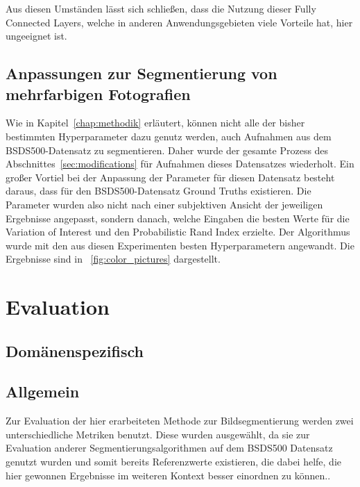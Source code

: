Aus diesen Umständen lässt sich schließen, dass die Nutzung dieser Fully Connected Layers, welche in anderen Anwendungsgebieten viele Vorteile hat, hier ungeeignet ist.

\subsection{Anpassungen zur Segmentierung von mehrfarbigen Fotografien}
\label{exp_colorpicture_optimization}

Wie in Kapitel~\ref{chap:methodik} erläutert, können nicht alle der bisher bestimmten Hyperparameter dazu genutz werden, auch Aufnahmen aus dem BSDS500-Datensatz zu segmentieren. Daher wurde der gesamte Prozess des Abschnittes~\ref{sec:modifications} für Aufnahmen dieses Datensatzes wiederholt. Ein großer Vortiel bei der Anpassung der Parameter für diesen Datensatz besteht daraus, dass für den BSDS500-Datensatz Ground Truths existieren. Die Parameter wurden also nicht nach einer subjektiven Ansicht der jeweiligen Ergebnisse angepasst, sondern danach, welche Eingaben die besten Werte für die Variation of Interest und den Probabilistic Rand Index erzielte. Der Algorithmus wurde mit den aus diesen Experimenten besten Hyperparametern angewandt. Die Ergebnisse sind in \figurename~\ref{fig:color_pictures} dargestellt.


\section{Evaluation}
\label{sec:evaluation}

\subsection{Domänenspezifisch}

\subsection{Allgemein}

Zur Evaluation der hier erarbeiteten Methode zur Bildsegmentierung werden zwei unterschiedliche Metriken benutzt. Diese wurden ausgewählt, da sie zur Evaluation anderer Segmentierungsalgorithmen auf dem BSDS500 Datensatz \cite{bsd500} genutzt wurden und somit bereits Referenzwerte existieren, die dabei helfe, die hier gewonnen Ergebnisse im weiteren Kontext besser einordnen zu können.. \cite{arbelaez_10, xia_17}

